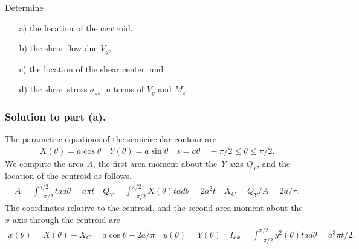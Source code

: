 \documentclass{AeroStructure-ERJohnson}
\begin{document}
\begin{example*}
Determine
\begin{enumerate}[b)]
  \item[a)] the location of the centroid,
  \item[b)] the shear flow due $V_{y}$,
  \item[c)] the location of the shear center, and
  \item[d)] the shear stress $\sigma_{z s}$ in terms of $V_{y}$ and $M_{z}$.
\end{enumerate}




\subsubsection{Solution to part (a).} The parametric equations of the semicircular contour are
\begin{align}\label{ex4.7a}
X(\theta)=a \cos \theta \quad Y(\theta)=a \sin \theta \quad s=a \theta \quad-\pi/2 \leq \theta \leq \pi/2.\end{align}
We compute the area \textit{A}, the first area moment about the \textit{Y}-axis $Q_{Y}$, and the location of the centroid as follows.
\begin{align}\label{ex4.7b}
A=\int_{-\pi/2}^{\pi/2} t a d \theta=a \pi t \quad Q_{Y}=\int_{-\pi/2}^{\pi/2} X(\theta) t a d \theta=2 a^{2} t \quad X_{C}=Q_{Y}/A=2 a/\pi.
\end{align}
\vspace*{-16pt}
\clearpage
\noindent The coordinates relative to the centroid, and the second area moment about the $x$-axis through the centroid are
\begin{align}\label{ex4.7c}
x(\theta)=X(\theta)-X_{C}=a \cos \theta-2 a/\pi \quad y(\theta)=Y(\theta) \quad I_{x x}=\int_{-\pi/2}^{\pi/2} y^{2}(\theta) t a d \theta=a^{3} \pi t/2.
\end{align}

\vspace*{-5pt}


\end{example*}
\end{document}

